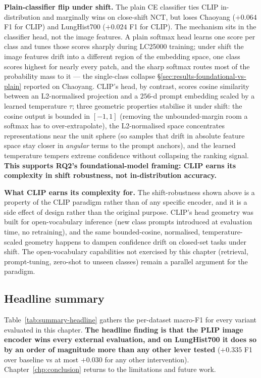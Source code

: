 \textbf{Plain-classifier flip under shift.} The plain CE classifier ties CLIP in-distribution and marginally wins on close-shift NCT, but loses Chaoyang ($+0.064$ F1 for CLIP) and LungHist700 ($+0.024$ F1 for CLIP). The mechanism sits in the classifier head, not the image features. A plain softmax head learns one score per class and tunes those scores sharply during LC25000 training; under shift the image features drift into a different region of the embedding space, one class scores highest for nearly every patch, and the sharp softmax routes most of the probability mass to it --- the single-class collapse §\ref{sec:results-foundational-vs-plain} reported on Chaoyang. CLIP's head, by contrast, scores cosine similarity between an L2-normalised projection and a $256$-d prompt embedding scaled by a learned temperature $\tau$; three geometric properties stabilise it under shift: the cosine output is bounded in $[-1, 1]$ (removing the unbounded-margin room a softmax has to over-extrapolate), the L2-normalised space concentrates representations near the unit sphere (so samples that drift in absolute feature space stay closer in \emph{angular} terms to the prompt anchors), and the learned temperature tempers extreme confidence without collapsing the ranking signal. \textbf{This supports RQ2's foundational-model framing: CLIP earns its complexity in shift robustness, not in-distribution accuracy.}

\textbf{What CLIP earns its complexity for.} The shift-robustness shown above is a property of the CLIP paradigm rather than of any specific encoder, and it is a side effect of design rather than the original purpose. CLIP's head geometry was built for open-vocabulary inference (new class prompts introduced at evaluation time, no retraining), and the same bounded-cosine, normalised, temperature-scaled geometry happens to dampen confidence drift on closed-set tasks under shift. The open-vocabulary capabilities not exercised by this chapter (retrieval, prompt-tuning, zero-shot to unseen classes) remain a parallel argument for the paradigm.

\subsection{Headline summary}

Table~\ref{tab:summary-headline} gathers the per-dataset macro-F1 for every variant evaluated in this chapter. \textbf{The headline finding is that the PLIP image encoder wins every external evaluation, and on LungHist700 it does so by an order of magnitude more than any other lever tested} ($+0.335$ F1 over baseline vs at most $+0.030$ for any other intervention). Chapter~\ref{chp:conclusion} returns to the limitations and future work.

